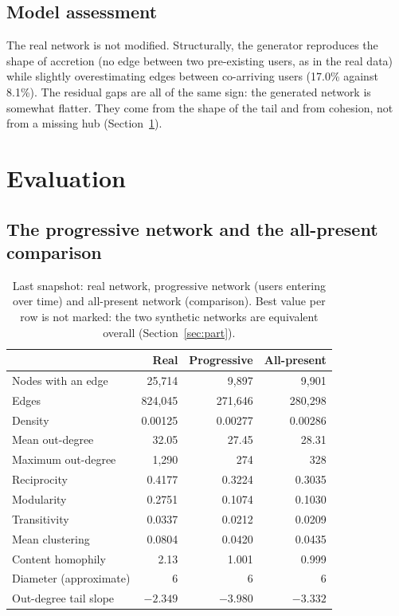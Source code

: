 \documentclass[11pt,a4paper]{article}
\begin{document}
\subsection{Model assessment}
The real network is not modified. Structurally, the generator reproduces the shape of accretion (no
edge between two pre-existing users, as in the real data) while slightly overestimating edges between
co-arriving users (17.0\% against 8.1\%). The residual gaps are all of the same sign: the generated
network is somewhat flatter. They come from the shape of the tail and from cohesion, not from a missing
hub (Section~\ref{sec:eval}).

\section{Evaluation}
\label{sec:eval}

\subsection{The progressive network and the all-present comparison}
\begin{table}[h]
  \centering
  \small
  \caption{Last snapshot: real network, progressive network (users entering over time) and all-present
  network (comparison). Best value per row is not marked: the two synthetic networks are equivalent
  overall (Section~\ref{sec:part}).}
  \label{tab:main}
  \begin{tabular}{@{}lrrr@{}}
    \toprule
    & Real & Progressive & All-present \\
    \midrule
    Nodes with an edge      & 25,714 & 9,897 & 9,901 \\
    Edges                   & 824,045 & 271,646 & 280,298 \\
    Density                 & 0.00125 & 0.00277 & 0.00286 \\
    Mean out-degree         & 32.05 & 27.45 & 28.31 \\
    Maximum out-degree      & 1,290 & 274 & 328 \\
    Reciprocity             & 0.4177 & 0.3224 & 0.3035 \\
    Modularity              & 0.2751 & 0.1074 & 0.1030 \\
    Transitivity            & 0.0337 & 0.0212 & 0.0209 \\
    Mean clustering         & 0.0804 & 0.0420 & 0.0435 \\
    Content homophily       & 2.13 & 1.001 & 0.999 \\
    Diameter (approximate)  & 6 & 6 & 6 \\
    Out-degree tail slope   & $-2.349$ & $-3.980$ & $-3.332$ \\
    \bottomrule
  \end{tabular}
\end{table}
\end{document}
